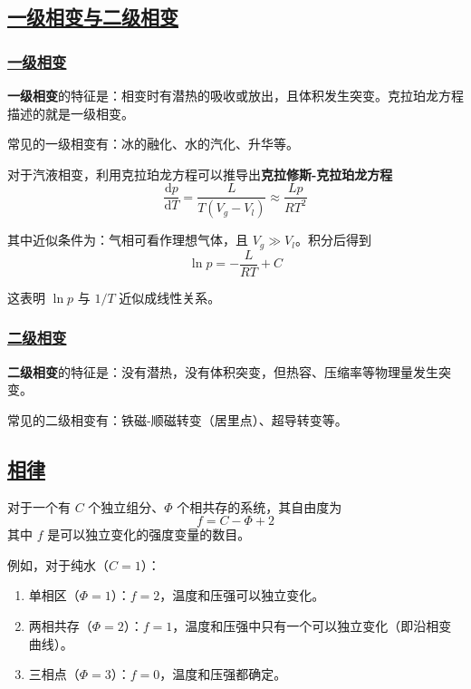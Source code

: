 \subsection{\protect\hyperlink{:}{一级相变与二级相变}}

\subsubsection{\protect\hyperlink{:}{一级相变}}

\textbf{一级相变}的特征是：相变时有潜热的吸收或放出，且体积发生突变。克拉珀龙方程描述的就是一级相变。

常见的一级相变有：冰的融化、水的汽化、升华等。

对于汽液相变，利用克拉珀龙方程可以推导出\textbf{克拉修斯-克拉珀龙方程}
\begin{equation}
    \frac{\mathrm{d}p}{\mathrm{d}T} = \frac{L}{T(V_g - V_l)} \approx \frac{Lp}{RT^2}
\end{equation}

其中近似条件为：气相可看作理想气体，且 $V_g \gg V_l$。积分后得到
\begin{equation}
    \ln p = -\frac{L}{RT} + C
\end{equation}

这表明 $\ln p$ 与 $1/T$ 近似成线性关系。

\subsubsection{\protect\hyperlink{:}{二级相变}}

\textbf{二级相变}的特征是：没有潜热，没有体积突变，但热容、压缩率等物理量发生突变。

常见的二级相变有：铁磁-顺磁转变（居里点）、超导转变等。

\subsection{\protect\hyperlink{:}{相律}}

\begin{theorem}[吉布斯相律]
    对于一个有 $C$ 个独立组分、$\Phi$ 个相共存的系统，其自由度为
    \begin{equation}
        f = C - \Phi + 2
    \end{equation}
    其中 $f$ 是可以独立变化的强度变量的数目。
\end{theorem}

例如，对于纯水（$C = 1$）：
\begin{enumerate}
    \item 单相区（$\Phi = 1$）：$f = 2$，温度和压强可以独立变化。
    \item 两相共存（$\Phi = 2$）：$f = 1$，温度和压强中只有一个可以独立变化（即沿相变曲线）。
    \item 三相点（$\Phi = 3$）：$f = 0$，温度和压强都确定。
\end{enumerate}
